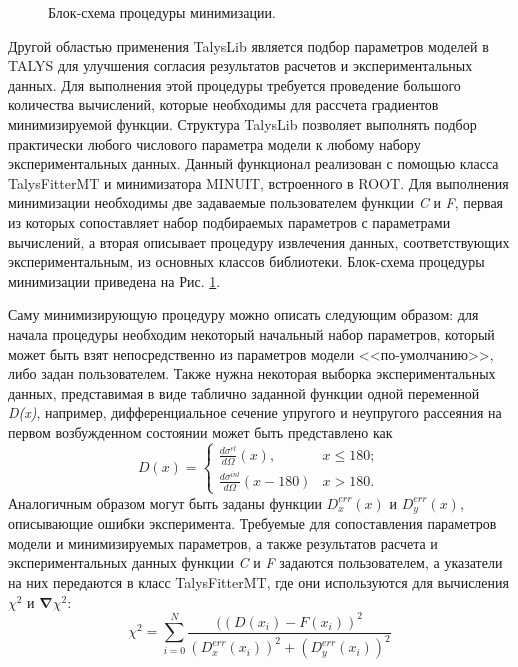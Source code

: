 \documentclass[a4paper,12pt]{extarticle}
\begin{document}
\begin{figure}
\caption{Блок-схема процедуры минимизации.}
\label{fig:MinimizationProcedure}
\end{figure}
Другой областью применения TalysLib является подбор параметров моделей в TALYS для улучшения согласия результатов расчетов и экспериментальных данных. Для выполнения этой процедуры требуется проведение большого количества вычислений, которые необходимы для рассчета градиентов минимизируемой функции. Структура TalysLib позволяет выполнять подбор практически любого числового параметра модели к любому набору экспериментальных данных. Данный функционал реализован с помощью класса TalysFitterMT и минимизатора MINUIT, встроенного в ROOT. Для выполнения минимизации необходимы две задаваемые пользователем функции \textit{C} и \textit{F}, первая из которых сопоставляет набор подбираемых параметров с параметрами вычислений, а вторая описывает процедуру извлечения данных, соответствующих экспериментальным, из основных классов библиотеки. Блок-схема процедуры минимизации приведена на Рис. \ref{fig:MinimizationProcedure}.

Саму минимизирующую процедуру можно описать следующим образом: для начала процедуры необходим некоторый начальный набор параметров, который может быть взят непосредственно из параметров модели <<по-умолчанию>>, либо задан пользователем. Также нужна некоторая выборка экспериментальных данных, представимая в виде таблично заданной функции одной переменной \textit{D(x)}, например, дифференциальное сечение упругого и неупругого рассеяния на первом возбужденном состоянии может быть представлено как 
\begin{equation}
D(x)=
	\begin{cases}
	\frac{d\sigma^{el}}{d\Omega}(x), & x\leq 180;\\
	\frac{d\sigma^{inl}}{d\Omega}(x-180) & x>180.
	\end{cases}
\end{equation}
Аналогичным образом могут быть заданы функции $D^{err}_x(x)$ и $D^{err}_y(x)$, описывающие ошибки эксперимента.
Требуемые для сопоставления параметров модели и минимизируемых параметров, а также результатов расчета и экспериментальных данных функции \textit{C} и \textit{F} задаются пользователем, а указатели на них передаются в класс TalysFitterMT, где они используются для вычисления $\chi^2$ и $\mathbf{\nabla} \chi^2$:
\begin{equation}
\chi^2=\sum\limits_{i=0}^N\frac{((D(x_i)-F(x_i))^2}{(D^{err}_x(x_i))^2+(D^{err}_y(x_i))^2}
\end{equation}
\end{document}

